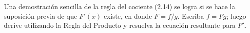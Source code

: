 \item Una demostración sencilla de la regla del cociente (2.14) se logra si se hace la suposición previa de que $F'(x)$ existe, en donde $F = f/g$. Escriba $f = Fg$; luego derive utilizando la Regla del Producto y resuelva la ecuación resultante para $F'$.
